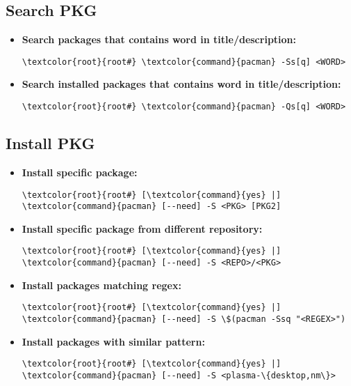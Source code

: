 \documentclass[10pt, a4paper, onecolumn, openany]{book} %
\begin{document}
\subsection{Search PKG}
\begin{itemize}
    \item \textbf{Search packages that contains word in title/description:}
\begin{Verbatim}[commandchars=\\\{\}]
\textcolor{root}{root#} \textcolor{command}{pacman} -Ss[q] <WORD>
\end{Verbatim}
    \item \textbf{Search installed packages that contains word in title/description:}
\begin{Verbatim}[commandchars=\\\{\}]
\textcolor{root}{root#} \textcolor{command}{pacman} -Qs[q] <WORD>
\end{Verbatim} 
\end{itemize}
\subsection{Install PKG}
\begin{itemize}
    \item \textbf{Install specific package:}
\begin{Verbatim}[commandchars=\\\{\}]
\textcolor{root}{root#} [\textcolor{command}{yes} |] \textcolor{command}{pacman} [--need] -S <PKG> [PKG2]
\end{Verbatim}
    \item \textbf{Install specific package from different repository:}
\begin{Verbatim}[commandchars=\\\{\}]
\textcolor{root}{root#} [\textcolor{command}{yes} |] \textcolor{command}{pacman} [--need] -S <REPO>/<PKG>
\end{Verbatim}
    \item \textbf{Install packages matching regex:}
\begin{Verbatim}[commandchars=\\\{\}]
\textcolor{root}{root#} [\textcolor{command}{yes} |] \textcolor{command}{pacman} [--need] -S \$(pacman -Ssq "<REGEX>")
\end{Verbatim}
    \item \textbf{Install packages with similar pattern:}
\begin{Verbatim}[commandchars=\\\{\}]
\textcolor{root}{root#} [\textcolor{command}{yes} |] \textcolor{command}{pacman} [--need] -S <plasma-\{desktop,nm\}>
\end{Verbatim}    
\end{itemize}
\end{document}
